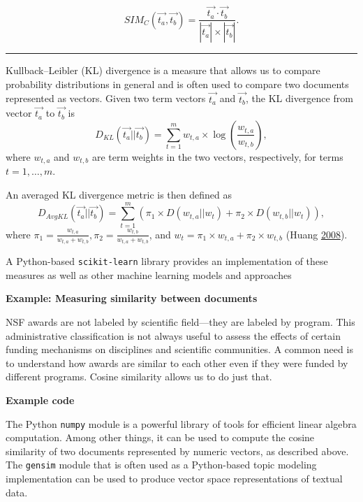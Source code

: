 \documentclass[]{krantz}
\begin{document}
\[SIM_C(\overrightarrow{t_a},\overrightarrow{t_b}) = \frac{\overrightarrow{t_a} \cdot
     \overrightarrow{t_b}}{|\overrightarrow{t_a}|\times|\overrightarrow{t_b}|}.\]

\begin{center}\rule{0.5\linewidth}{\linethickness}\end{center}

Kullback--Leibler (KL) divergence is a measure that allows us to compare
probability distributions in general and is often used to compare two
documents represented as vectors. Given two term vectors
\(\overrightarrow{t_a}\) and \(\overrightarrow{t_b}\), the KL divergence
from vector \(\overrightarrow{t_a}\) to \(\overrightarrow{t_b}\) is
\[D_{KL}(\overrightarrow{t_a}||\overrightarrow{t_b}) =
\sum\limits_{t=1}^m w_{t,a}\times
\log\left(\frac{w_{t,a}}{w_{t,b}}\right),\] where \(w_{t,a}\) and
\(w_{t,b}\) are term weights in the two vectors, respectively, for terms
\(t=1, \ldots, m\).

An averaged KL divergence metric is then defined as
\[D_{AvgKL}(\overrightarrow{t_a}||\overrightarrow{t_b}) = \sum\limits_{t=1}^m (\pi_1\times D(w_{t,a}||w_t)+\pi_2\times D(w_{t,b}||w_t)),\]
where
\(\pi_1 = \frac{w_{t,a}}{w_{t,a}+w_{t,b}}, \pi_2 = \frac{w_{t,b}}{w_{t,a}+w_{t,b}}\),
and \(w_t = \pi_1\times w_{t,a} + \pi_2\times w_{t,b}\) (Huang
\protect\hyperlink{ref-huang-08}{2008}).

A Python-based \texttt{scikit-learn} library provides an implementation
of these measures as well as other machine learning models and
approaches

\textbf{Example: Measuring similarity between documents}

NSF awards are not labeled by scientific field---they are labeled by
program. This administrative classification is not always useful to
assess the effects of certain funding mechanisms on disciplines and
scientific communities. A common need is to understand how awards are
similar to each other even if they were funded by different programs.
Cosine similarity allows us to do just that.

\textbf{Example code}

The Python \texttt{numpy} module is a powerful library of tools for
efficient linear algebra computation. Among other things, it can be used
to compute the cosine similarity of two documents represented by numeric
vectors, as described above. The \texttt{gensim} module that is often
used as a Python-based topic modeling implementation can be used to
produce vector space representations of textual data.
\end{document}

